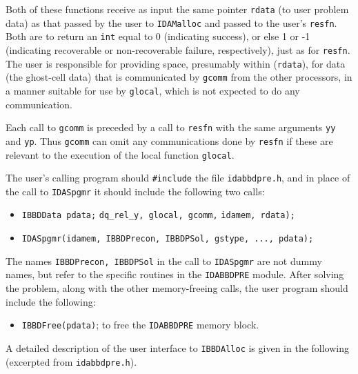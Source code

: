 Both of these functions receive as input the same pointer {\tt rdata}
(to user problem data) as that passed by the user to {\tt IDAMalloc}
and passed to the user's {\tt resfn}.  Both are to return an {\tt int}
equal to 0 (indicating success), or else 1 or -1 (indicating
recoverable or non-recoverable failure, respectively), just as for
{\tt resfn}.  The user is responsible for providing space, presumably
within ({\tt *rdata}), for data (the ghost-cell data) that is
communicated by {\tt gcomm} from the other processors, in a manner
suitable for use by {\tt glocal}, which is not expected to do any
communication.

Each call to {\tt gcomm} is preceded by a call to {\tt resfn} with the
same arguments {\tt yy} and {\tt yp}. Thus {\tt gcomm} can omit any
communications done by {\tt resfn} if these are relevant to the
execution of the local function {\tt glocal}.

The user's calling program should {\tt \#include} the file 
{\tt idabbdpre.h}, and in place of the call to {\tt IDASpgmr} it
should include the following two calls:

\begin{itemize}

\item {\tt IBBDData pdata;}
         {\tt dq\_rel\_y, glocal, gcomm,}
\newline \hspace*{1.5in} {\tt idamem, rdata);}
\item  {\tt IDASpgmr(idamem, IBBDPrecon, IBBDPSol, gstype, ..., pdata);}

\end{itemize}
The names {\tt IBBDPrecon, IBBDPSol} in the call to {\tt IDASpgmr}
are not dummy names, but refer to the specific routines in the
{\tt IDABBDPRE} module.
After solving the problem, along with the other memory-freeing calls,
the user program should include the following:

\begin{itemize}
\item  {\tt IBBDFree(pdata)}; to free the {\tt IDABBDPRE} memory block.
\end{itemize}

A detailed description of the user interface to {\tt IBBDAlloc} is
given in the following (excerpted from {\tt idabbdpre.h}).

